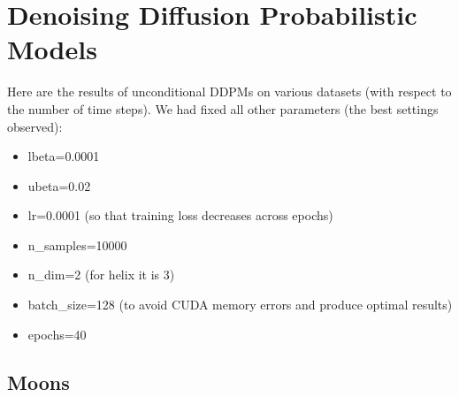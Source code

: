 \documentclass[a4paper,12pt]{article}
\title{\cooltitle{CS726 Programming Assignment -- 2 Report}}
\author{
\textbf{Saksham Rathi (22B1003)}\\
\textbf{Sharvanee Sonawane (22B0943)}\\
\textbf{Deeksha Dhiwakar (22B0988)}\\
\small Department of Computer Science, \\
Indian Institute of Technology Bombay \\}
\date{}
\begin{document}
\maketitle

\section*{Denoising Diffusion Probabilistic Models}

Here are the results of unconditional DDPMs on various datasets (with respect to the number of time steps). We had fixed all other parameters (the best settings observed):

\begin{itemize}
  \item lbeta=0.0001
  \item ubeta=0.02
  \item lr=0.0001 (so that training loss decreases across epochs)
  \item n\_samples=10000
  \item n\_dim=2 (for helix it is 3)
  \item batch\_size=128 (to avoid CUDA memory errors and produce optimal results)
  \item epochs=40
\end{itemize}

\clearpage
\subsection*{Moons}
\end{document}
